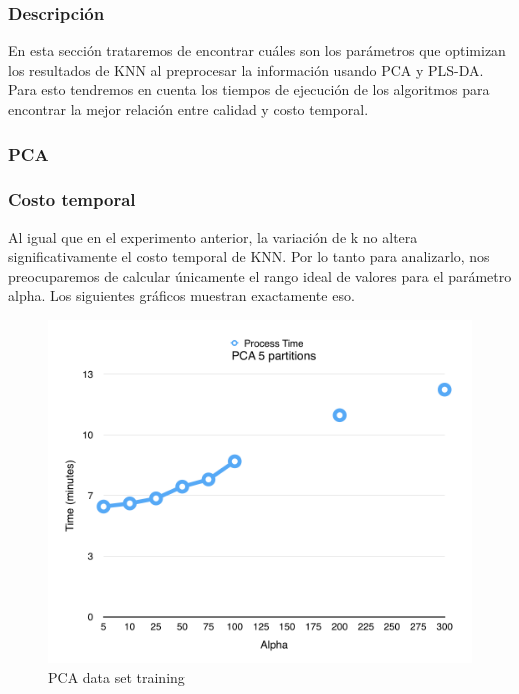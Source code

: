 \subsubsection{Descripción}

En esta sección trataremos de encontrar cuáles son los parámetros que optimizan los resultados de KNN al preprocesar la información usando PCA y PLS-DA. Para esto tendremos en cuenta los tiempos de ejecución de los algoritmos para encontrar la mejor relación entre calidad y costo temporal.

\subsubsection{PCA}

\subsubsection*{Costo temporal}

Al igual que en el experimento anterior, la variación de k no altera significativamente el costo temporal de KNN. Por lo tanto para analizarlo, nos preocuparemos de calcular únicamente el rango ideal de valores para el parámetro alpha. Los siguientes gráficos muestran exactamente eso.

\begin{figure}[h!]
  \begin{center}
	\includegraphics[scale=0.7]{exp2/PCA-Process-Time.png}
	\caption{PCA data set training}
  \end{center}
\end{figure}

